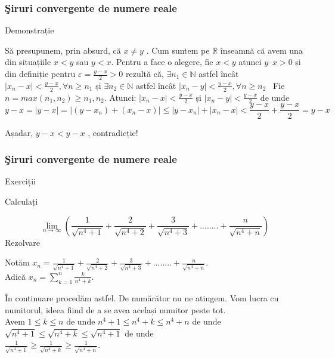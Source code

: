 \documentclass{beamer}
\theoremstyle{plain}
\begin{document}
\frame
{
\frametitle{\c Siruri convergente de numere reale}
Demonstrație

Să presupunem, prin absurd, că \(x \neq  y\) . Cum suntem pe \(\mathbb{R}\) înseamnă că avem una din situațiile \(x < y\) sau \(y < x\). Pentru a face o alegere, fie \(x < y\) atunci \(y – x > 0\) și din definiție pentru \(\varepsilon = \frac{y- x}{2}  > 0\) rezultă că, 
\(\exists  n_{1} \in \mathbb{N}\) astfel încât \(\left | x_{n} - x  \right | < \frac{y - x }{2} , \forall n \geq n_{1} \)
și 
\(\exists  n_{2} \in \mathbb{N}\) astfel încât \(\left | x_{n} - y  \right | < \frac{y - x }{2} , \forall n \geq n_{2}\) 
Fie \(n = max (n _{1}, n_{2}) \geq n_{1}, n_{2}.\) Atunci: 
\(\left | x_{n} - x \right | < \frac{y-x}{2}\) și \(\left | x_{n} - y  \right | <  \frac{y-x}{2}\)
de unde 
\begin{displaymath}
  y-x = \left | y-x \right | = \left | (y-x_{n})+ (x_{n} -x) \right |\leq \left | y-x_{n} \right | + \left | x_{n} - x \right | < \frac{y-x}{2} + \frac{y-x}{2} = y-x
\end{displaymath}

	Așadar, \(y-x < y-x\) , contradicție!
}
\frame
{
\frametitle{\c Siruri convergente de numere reale}
Exerciții

Calculați 

\begin{displaymath}
  \lim_{n\to\infty }\left ( \frac{1}{\sqrt{n^{4}+1}}+ \frac{2}{\sqrt{n^{4}+2} } +\frac{3}{\sqrt{n^{4}+3}}+........+\frac{n}{\sqrt{n^{4}+n}}  \right )
\end{displaymath}
Rezolvare

Notăm \(x_{n}= \frac{1}{\sqrt{n^{4}+1}} + \frac{2}{\sqrt{n^{4}+2}}+\frac{3}{\sqrt{n^{4}+3}}+........+\frac{n}{\sqrt{n^{4}+n}}\).
\\ Adică \(x_{n}= \sum_{k=1}^{n}\frac{k}{n^{4}+k}\).

În continuare procedăm astfel. De numărător nu ne atingem. Vom lucra cu numitorul, ideea fiind de a se avea același numitor peste tot. 
\\ Avem \(1\leq k\leq n\) de unde \(n^{4}+1 \leq n^{4}+k \leq n^{4}+n\) de unde\\  \(\sqrt{n^{4}+1}\leq \sqrt{n^{4}+k}\leq \sqrt{n^{4}+1}\) de unde \\ \(\frac{1}{\sqrt{n^{4}+1}}\geq \frac{1}{\sqrt{n^{4}+k}}\geq \frac{1}{\sqrt{n^{4}+n}}\).

}
\end{document}

